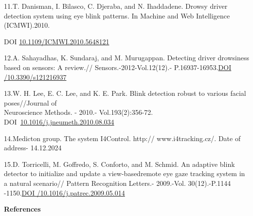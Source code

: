 \begin{references}
11.T. Danisman, I. Bilasco, C. Djeraba, and N. Ihaddadene. Drowsy driver
detection system using eye blink patterns. In Machine and Web
Intelligence (ICMWI).2010.

DOI
\href{http://dx.doi.org/10.1109/ICMWI.2010.5648121}{10.1109/ICMWI.2010.5648121}

12.A. Sahayadhas, K. Sundaraj, and M. Murugappan. Detecting driver
drowsiness based on sensors: A review.// Sensors.-2012-Vol.12(12).-
P.16937-16953.\href{https://doi.org/10.3390/s121216937}{DOI
/10.3390/s121216937}

13.W. H. Lee, E. C. Lee, and K. E. Park. Blink detection robust to
various facial poses//Journal of \\Neuroscience Methods. - 2010.-
Vol.193(2):356-72.
DOI~\href{https://doi.org/10.1016/j.jneumeth.2010.08.034}{10.1016/j.jneumeth.2010.08.034}

14.Medicton group. The system I4Control. http:// www.i4tracking.cz/.
Date of address- 14.12.2024

15.D. Torricelli, M. Goffredo, S. Conforto, and M. Schmid. An adaptive
blink detector to initialize and update a view-basedremote eye gaze
tracking system in a natural scenario// Pattern Recognition Letters.-
2009.-Vol. 30(12).-P.1144
-1150.\href{https://doi.org/10.1016/j.patrec.2009.05.014}{DOI
/10.1016/j.patrec.2009.05.014}
\end{references}

\begin{center}
{\bfseries References}
\end{center}

